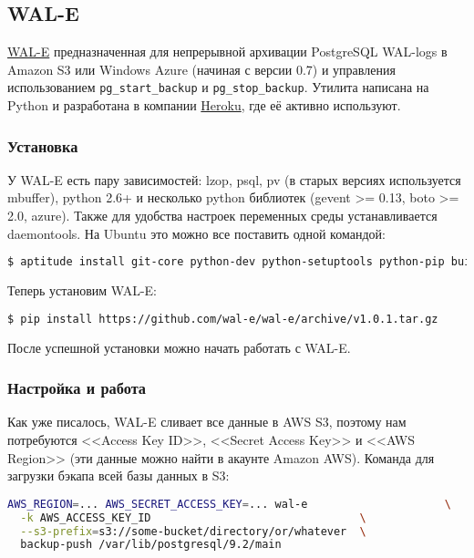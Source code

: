 \subsection{WAL-E}

\href{https://github.com/wal-e/wal-e}{WAL-E} предназначенная для непрерывной архивации PostgreSQL WAL-logs в Amazon S3 или Windows Azure (начиная с версии 0.7) и управления использованием \lstinline!pg_start_backup! и \lstinline!pg_stop_backup!. Утилита написана на Python и разработана в компании \href{http://www.heroku.com/}{Heroku}, где её активно используют.


\subsubsection{Установка}

У WAL-E есть пару зависимостей: lzop, psql, pv (в старых версиях используется mbuffer), python 2.6+ и несколько python библиотек (gevent >= 0.13, boto >= 2.0, azure). Также для удобства настроек переменных среды устанавливается daemontools. На Ubuntu это можно все поставить одной командой:

\begin{lstlisting}[language=Bash,label=lst:wal-e1,caption=Установка зависимостей для WAL-E]
$ aptitude install git-core python-dev python-setuptools python-pip build-essential libevent-dev lzop pv daemontools daemontools-run
\end{lstlisting}

Теперь установим WAL-E:

\begin{lstlisting}[language=Bash,label=lst:wal-e2,caption=Установка WAL-E]
$ pip install https://github.com/wal-e/wal-e/archive/v1.0.1.tar.gz
\end{lstlisting}

После успешной установки можно начать работать с WAL-E.

\subsubsection{Настройка и работа}

Как уже писалось, WAL-E сливает все данные в AWS S3, поэтому нам потребуются <<Access Key ID>>, <<Secret Access Key>> и <<AWS Region>> (эти данные можно найти в акаунте Amazon AWS). Команда для загрузки бэкапа всей базы данных в S3:

\begin{lstlisting}[language=Bash,label=lst:wal-e3,caption=Загрузка бэкапа всей базы данных в S3]
AWS_REGION=... AWS_SECRET_ACCESS_KEY=... wal-e                     \
  -k AWS_ACCESS_KEY_ID                                \
  --s3-prefix=s3://some-bucket/directory/or/whatever  \
  backup-push /var/lib/postgresql/9.2/main
\end{lstlisting}

